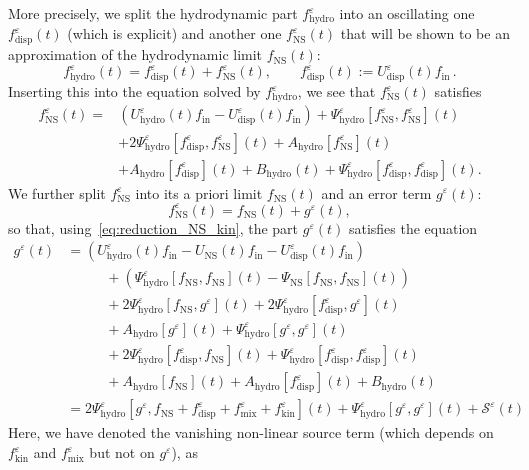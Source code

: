 \documentclass[AHL,Unicode,longabstracts,published]{cedram}
\newcommand{\ini}{\mathrm{in}}
\newcommand{\ns}{\mathrm{NS}}
\newcommand{\hyd}{\mathrm{hydro}}
\newcommand{\mix}{\mathrm{mix}}
\newcommand{\kin}{\mathrm{kin}}
\newcommand{\disp}{\mathrm{disp}}
\renewcommand{\SS}{\mathcal{S}}
\newcommand*\eps{{\varepsilon}}
\begin{document}
More precisely, we split the hydrodynamic part $f^\eps_\hyd$ into an oscillating one $f^\eps_\disp(t)$ (which is explicit) and another one $f^\eps_\ns(t)$ that will be shown to be an approximation of the hydrodynamic limit $f_\ns(t)$:
\begin{equation}\label{eq:fepshyd}
f^\eps_\hyd(t) = f^\eps_\disp(t) + f^\eps_\ns(t), \qquad f^\eps_\disp(t) := U^\eps_\disp(t) f_{\ini}\,.
\end{equation}
Inserting this into the equation solved by $f^\eps_\hyd$, we see that $f^\eps_\ns(t)$ satisfies
\begingroup
\allowdisplaybreaks
\begin{align*}
f^\eps_\ns(t) =& \left(U^\eps_\hyd(t)f_\ini - U^\eps_\disp(t)f_\ini\right) + \Psi^\eps_\hyd\left[f^\eps_\ns, f^\eps_\ns \right](t)\\
&+ 2 \Psi^\eps_\hyd\left[f^\eps_\disp, f^\eps_\ns\right](t) + A_\hyd\left[f^\eps_\ns\right](t)\\
&+ A_\hyd\left[f^\eps_\disp\right](t) + B_\hyd(t) + \Psi^\eps_\hyd\left[f_\disp^\eps, f_\disp^\eps \right](t).
\end{align*}
\endgroup
We further split $f^\eps_\ns$ into its a priori limit $f_\ns(t)$ and an error term $g^\eps(t)$:
\[
f^\eps_\ns(t) = f_\ns(t) + g^\eps(t),
\]
so that, using~\eqref{eq:reduction_NS_kin}, the part $g^\eps(t)$ satisfies the equation
\begin{align*}
g^\eps(t) &= \left(U^\eps_\hyd(t)f_{\ini} - U_\ns(t)f_{\ini} - U^\eps_\disp(t)f_\ini\right)\\
&\phantom{+++} + \left(\Psi^\eps_\hyd\left[f_\ns, f_\ns \right](t) - \Psi_\ns\left[f_\ns, f_\ns \right](t)\right)
\\
&\phantom{+++} + 2 \Psi^\eps_\hyd\left[f_\ns, g^\eps \right](t) + 2 \Psi^\eps_\hyd\left[f^\eps_\disp, g^\eps \right](t)\\
&\phantom{+++} + A_\hyd\left[g^\eps\right](t) + \Psi^\eps_\hyd\left[g^\eps, g^\eps\right](t) \\
&\phantom{+++} + 2 \Psi^\eps_\hyd\left[f^\eps_\disp, f_\ns \right](t) + \Psi^\eps_\hyd\left[f^\eps_\disp, f^\eps_\disp\right](t) \\
&\phantom{+++} + A_\hyd\left[f_\ns\right](t) + A_\hyd\left[f^\eps_\disp\right](t) + B_\hyd(t) \\
&=2 \Psi^\eps_\hyd\left[g^\eps, f_\ns + f^\eps_\disp + f^\eps_\mix + f^\eps_\kin\right](t) + \Psi^\eps_\hyd\left[g^\eps, g^\eps\right](t) + \SS^\eps(t)
\end{align*}
Here, we have denoted the vanishing non-linear source term (which depends on $f^\eps_\kin$ and $f^\eps_\mix$ but not on $g^\eps$), as
\end{document}
